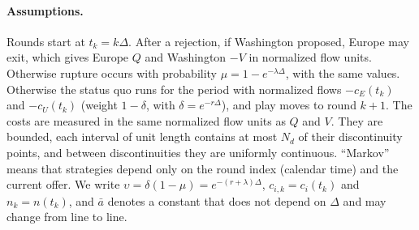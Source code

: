 \paragraph{Assumptions.} Rounds start at $t_k=k\Delta$. After a rejection, if Washington proposed, Europe may exit, which gives Europe $Q$ and Washington $-V$ in normalized flow units. Otherwise rupture occurs with probability $\mu=1-e^{-\lambda\Delta}$, with the same values. Otherwise the status quo runs for the period with normalized flows $-c_E(t_k)$ and $-c_U(t_k)$ (weight $1-\delta$, with $\delta=e^{-r\Delta}$), and play moves to round $k+1$. The costs are measured in the same normalized flow units as $Q$ and $V$. They are bounded, each interval of unit length contains at most $N_d$ of their discontinuity points, and between discontinuities they are uniformly continuous. ``Markov'' means that strategies depend only on the round index (calendar time) and the current offer. We write $\upsilon=\delta(1-\mu)=e^{-(r+\lambda)\Delta}$, $c_{i,k}=c_i(t_k)$ and $n_k=n(t_k)$, and $\bar a$ denotes a constant that does not depend on $\Delta$ and may change from line to line.

